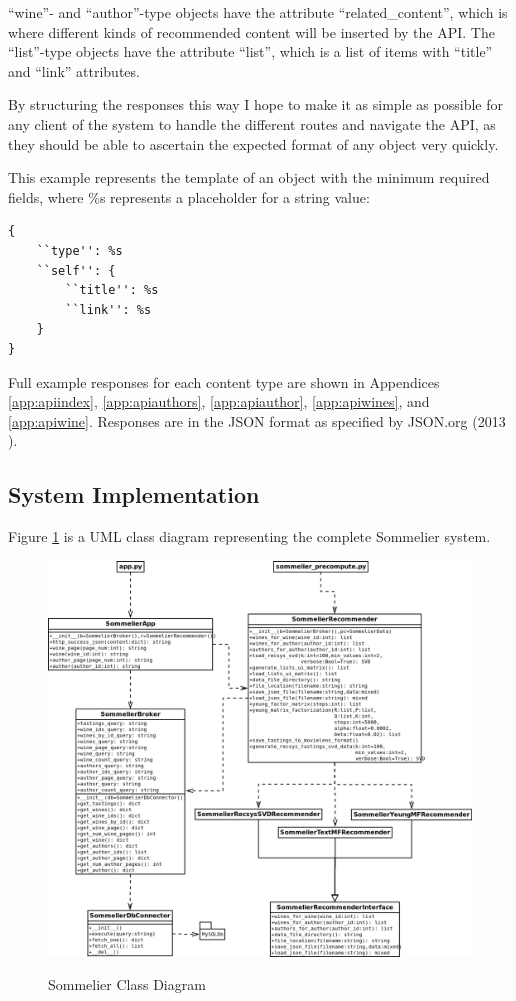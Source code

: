 ``wine''- and ``author''-type objects have the attribute ``related\_content'', which is where different kinds of recommended content will be inserted by the API. The ``list''-type objects have the attribute ``list'', which is a list of items with ``title'' and ``link'' attributes.

By structuring the responses this way I hope to make it as simple as possible for any client of the system to handle the different routes and navigate the API, as they should be able to ascertain the expected format of any object very quickly. 

This example represents the template of an object with the minimum required fields, where \%s represents a placeholder for a string value:

\footnotesize\begin{verbatim}
{
    ``type'': %s
    ``self'': {
        ``title'': %s
        ``link'': %s
    }
}
\end{verbatim}\normalsize

Full example responses for each content type are shown in Appendices \ref{app:apiindex}, \ref{app:apiauthors}, \ref{app:apiauthor}, \ref{app:apiwines}, and \ref{app:apiwine}. Responses are in the JSON format as specified by JSON.org (2013 \cite{JsonOrg}). 

\subsection{System Implementation}

Figure \ref{fig:sommelierclasses} is a UML class diagram representing the complete Sommelier system.

\begin{figure}[h!]
    \caption{Sommelier Class Diagram}
    \centering
        \includegraphics[width=15cm]{SommelierClassDiagram}
    \label{fig:sommelierclasses}
\end{figure}

